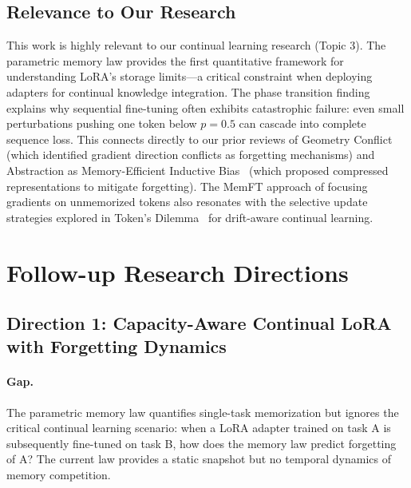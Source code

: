 \documentclass[11pt,a4paper]{article}
\begin{document}
\subsection{Relevance to Our Research}

This work is highly relevant to our continual learning research (Topic 3). The parametric memory law provides the first quantitative framework for understanding LoRA's storage limits---a critical constraint when deploying adapters for continual knowledge integration. The phase transition finding explains why sequential fine-tuning often exhibits catastrophic failure: even small perturbations pushing one token below $p = 0.5$ can cascade into complete sequence loss. This connects directly to our prior reviews of Geometry Conflict~\cite{geometry2026} (which identified gradient direction conflicts as forgetting mechanisms) and Abstraction as Memory-Efficient Inductive Bias~\cite{abstraction2026} (which proposed compressed representations to mitigate forgetting). The MemFT approach of focusing gradients on unmemorized tokens also resonates with the selective update strategies explored in Token's Dilemma~\cite{tokendilemma2026} for drift-aware continual learning.

\section{Follow-up Research Directions}

\subsection{Direction 1: Capacity-Aware Continual LoRA with Forgetting Dynamics}

\paragraph{Gap.} The parametric memory law quantifies single-task memorization but ignores the critical continual learning scenario: when a LoRA adapter trained on task A is subsequently fine-tuned on task B, how does the memory law predict forgetting of A? The current law provides a static snapshot but no temporal dynamics of memory competition.
\end{document}

